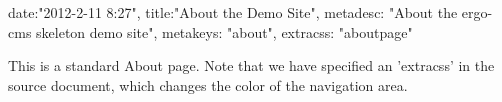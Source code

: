 {
date:"2012-2-11 8:27",
title:"About the Demo Site",
metadesc: "About the ergo-cms skeleton demo site",
metakeys: "about",
extracss: "aboutpage"
}

This is a standard About page. Note that we have specified an 'extracss' in the source document, which changes the color of the navigation area.